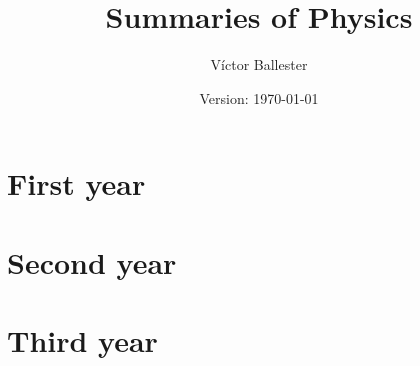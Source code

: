 \documentclass[10pt,a4paper]{report}
\title{Summaries of Physics}
\author{Víctor Ballester}
\date{Version: \today}
\begin{document}
\maketitle
\newpage
\tableofcontents
\newpage

\cleardoublepage
\chapter{First year}
\newpage
%       


\cleardoublepage


\cleardoublepage

%       
\chapter{Second year}
\newpage
%       

%       


\cleardoublepage
\chapter{Third year}
\newpage


\cleardoublepage

\end{document}
